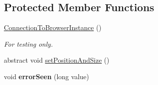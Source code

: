 \subsection*{Protected Member Functions}
\begin{DoxyCompactItemize}
\item 
\hypertarget{classgov_1_1fnal_1_1ppd_1_1dd_1_1display_1_1client_1_1ConnectionToBrowserInstance_a62e9f3f45ac4ac5f73f5354222f91d9b}{\hyperlink{classgov_1_1fnal_1_1ppd_1_1dd_1_1display_1_1client_1_1ConnectionToBrowserInstance_a62e9f3f45ac4ac5f73f5354222f91d9b}{Connection\-To\-Browser\-Instance} ()}\label{classgov_1_1fnal_1_1ppd_1_1dd_1_1display_1_1client_1_1ConnectionToBrowserInstance_a62e9f3f45ac4ac5f73f5354222f91d9b}

\begin{DoxyCompactList}\small\item\em For testing only. \end{DoxyCompactList}\item 
abstract void \hyperlink{classgov_1_1fnal_1_1ppd_1_1dd_1_1display_1_1client_1_1ConnectionToBrowserInstance_ab2e0c759d6320130b801f7502502584e}{set\-Position\-And\-Size} ()
\item 
\hypertarget{classgov_1_1fnal_1_1ppd_1_1dd_1_1display_1_1client_1_1ConnectionToBrowserInstance_a109be55359b99967b7fbfe59d8614eca}{void {\bfseries error\-Seen} (long value)}\label{classgov_1_1fnal_1_1ppd_1_1dd_1_1display_1_1client_1_1ConnectionToBrowserInstance_a109be55359b99967b7fbfe59d8614eca}

\end{DoxyCompactItemize}
